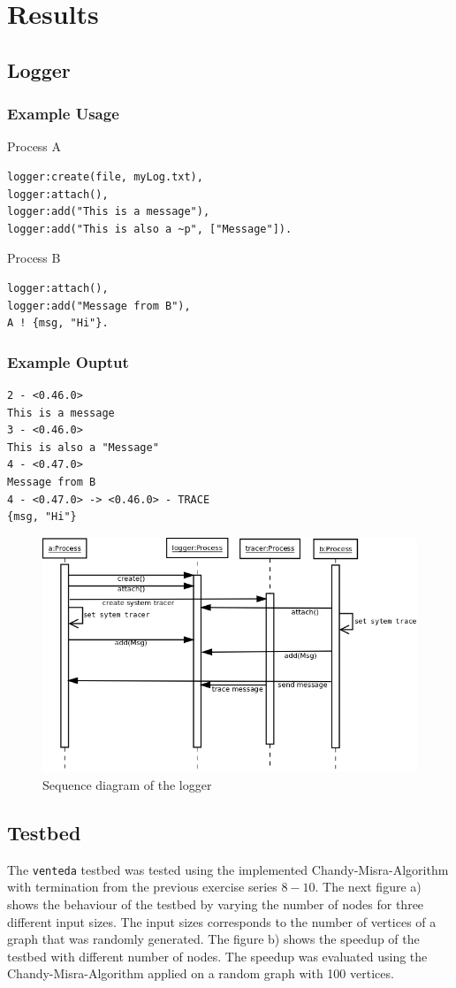 \documentclass[10pt,a4wide]{article}
\begin{document}
\section{Results}
\subsection{Logger}
\subsubsection{Example Usage}
Process A
\begin{lstlisting}
logger:create(file, myLog.txt),
logger:attach(),
logger:add("This is a message"),
logger:add("This is also a ~p", ["Message"]).
\end{lstlisting}
Process B
\begin{lstlisting}
logger:attach(),
logger:add("Message from B"),
A ! {msg, "Hi"}.
\end{lstlisting}

\subsubsection{Example Ouptut}
\begin{lstlisting}
2 - <0.46.0>
This is a message
3 - <0.46.0>
This is also a "Message"
4 - <0.47.0>
Message from B
4 - <0.47.0> -> <0.46.0> - TRACE
{msg, "Hi"}
\end{lstlisting}

\begin{figure}[!htb]
\includegraphics[scale=0.35]{png/logger_sequence.png} 
\centering
\caption{Sequence diagram of the logger}
\end{figure}

\subsection{Testbed}
The \texttt{venteda} testbed was tested using the implemented Chandy-Misra-Algorithm with termination from the previous exercise series $8-10$. The next figure a) shows the behaviour of the testbed by varying the number of nodes for three different input sizes. The input sizes corresponds to the number of vertices of a graph that was randomly generated. The figure b) shows the speedup of the testbed with different number of nodes. The speedup was evaluated using the Chandy-Misra-Algorithm applied on a random graph with 100 vertices.
\end{document}
